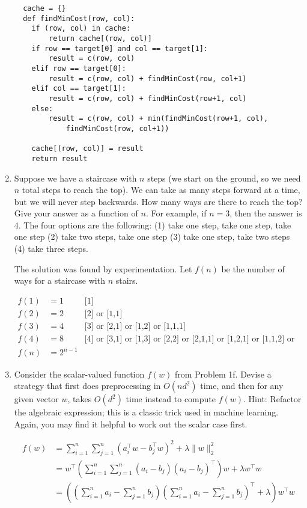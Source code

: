 \documentclass[10pt]{article}
\begin{document}
\begin{enumerate}[label=(\alph*)]
  \begin{lstlisting}
  cache = {}
  def findMinCost(row, col):
  	if (row, col) in cache:
  		return cache[(row, col)]
  	if row == target[0] and col == target[1]:
  		result = c(row, col)
  	elif row == target[0]:
  		result = c(row, col) + findMinCost(row, col+1)
  	elif col == target[1]:
  		result = c(row, col) + findMinCost(row+1, col)
  	else:
  		result = c(row, col) + min(findMinCost(row+1, col),
  			findMinCost(row, col+1))
  		
  	cache[(row, col)] = result
  	return result
  \end{lstlisting}
  
  \item Suppose we have a staircase with $n$ steps (we start on the ground, so we need $n$ total steps to reach the top). We can take as many steps forward at a time, but we will never step backwards. How many ways are there to reach the top? Give your answer as a function of $n$. For example, if $n=3$, then the answer is 4. The four options are the following: (1) take one step, take one step, take one step (2) take two steps, take one step (3) take one step, take two steps (4) take three steps.
  
  The solution was found by experimentation. Let $f(n)$ be the number of ways for a staircase with $n$ stairs.
  
  \begin{align*}
  f(1) &= 1 &\text{[1]}\\
  f(2) &= 2 &\text{[2] or [1,1]}\\
  f(3) &= 4 &\text{[3] or [2,1] or [1,2] or [1,1,1]}\\
  f(4) &= 8 &\text{[4] or [3,1] or [1,3] or [2,2] or [2,1,1] or [1,2,1] or [1,1,2] or [1,1,1,1]}\\
  f(n) &= 2^{n-1}
  \end{align*}
  
  \item Consider the scalar-valued function $f(w)$ from Problem 1f. Devise a strategy that first does preprocessing in $O(nd^2)$ time, and then for any given vector $w$, takes $O(d^2)$ time instead to compute $f(w)$.
Hint: Refactor the algebraic expression; this is a classic trick used in machine learning. Again, you may find it helpful to work out the scalar case first.

  \begin{align*}
  f(w) &= \sum_{i=1}^n \sum_{j=1}^n (a_i^\top w - b_j^\top w)^2 + \lambda \lVert w \rVert_2^2\\
  &= w^{\top} \left( \sum_{i = 1}^n \sum_{j = 1}^n (a_i - b_j)(a_i - b_j)^{\top} \right) w + \lambda w^{\top}w\\
  &= \left( \left(\sum_{i = 1}^n a_i - \sum_{j = 1}^n b_j\right)\left(\sum_{i = 1}^n a_i - \sum_{j = 1}^n b_j\right)^{\top} + \lambda \right) w^{\top}w
  \end{align*}

\end{enumerate}
\fi
\end{document}
